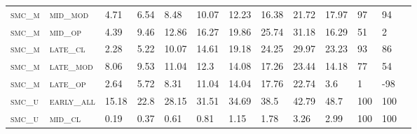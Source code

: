 \begin{landscape}
\begin{table}[!htbp]
\begin{tabular}{@{}lllllllllllll@{}}
\footnotesize \textsc{smc\_m}      & \footnotesize \textsc{mid\_mod  }               & \footnotesize 4.71           & \footnotesize  6.54           & \footnotesize 8.48             & \footnotesize 10.07            & \footnotesize 12.23            & \footnotesize 16.38            & \footnotesize 21.72       & \footnotesize 17.97    & \footnotesize 97      & \footnotesize 94    \\
\footnotesize \textsc{smc\_m}      & \footnotesize \textsc{mid\_op   }               & \footnotesize 4.39           & \footnotesize  9.46           & \footnotesize 12.86            & \footnotesize 16.27            & \footnotesize 19.86            & \footnotesize 25.74            & \footnotesize 31.18       & \footnotesize 16.29    & \footnotesize 51      & \footnotesize 2    \\
\footnotesize \textsc{smc\_m}      & \footnotesize \textsc{late\_cl  }               & \footnotesize 2.28           & \footnotesize  5.22           & \footnotesize 10.07            & \footnotesize 14.61            & \footnotesize 19.18            & \footnotesize 24.25            & \footnotesize 29.97       & \footnotesize 23.23    & \footnotesize 93      & \footnotesize 86    \\
\footnotesize \textsc{smc\_m}      & \footnotesize \textsc{late\_mod }               & \footnotesize 8.06           & \footnotesize  9.53           & \footnotesize 11.04            & \footnotesize 12.3             & \footnotesize 14.08            & \footnotesize 17.26            & \footnotesize 23.44       & \footnotesize 14.18    & \footnotesize 77      & \footnotesize 54    \\
\footnotesize \textsc{smc\_m}      & \footnotesize \textsc{late\_op  }               & \footnotesize 2.64           & \footnotesize  5.72           & \footnotesize 8.31             & \footnotesize 11.04            & \footnotesize 14.04            & \footnotesize 17.76            & \footnotesize 22.74       & \footnotesize 3.6      & \footnotesize 1       & \footnotesize -98    \\
\footnotesize \textsc{smc\_u}      & \footnotesize \textsc{early\_all}               & \footnotesize 15.18          & \footnotesize  22.8           & \footnotesize 28.15            & \footnotesize 31.51            & \footnotesize 34.69            & \footnotesize 38.5             & \footnotesize 42.79       & \footnotesize 48.7     & \footnotesize 100     & \footnotesize 100    \\
\footnotesize \textsc{smc\_u}      & \footnotesize \textsc{mid\_cl   }               & \footnotesize 0.19           & \footnotesize  0.37           & \footnotesize 0.61             & \footnotesize 0.81             & \footnotesize 1.15             & \footnotesize 1.78             & \footnotesize 3.26        & \footnotesize 2.99     & \footnotesize 100     & \footnotesize 100    \\

\end{tabular}
\end{table}
\end{landscape}
